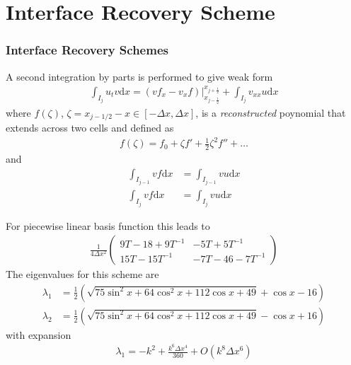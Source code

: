 \documentclass[serif,12pt]{beamer}
\begin{document}
\section{Interface Recovery Scheme}
\begin{frame}
  \frametitle{Interface Recovery Schemes}
  A second integration by parts is performed to give weak form
  \begin{align*}
    \int_{I_j} u_t v \mathrm{d}x 
    =
    \left(vf_x - v_xf\right) \bigr|_{x_{j-\frac{1}{2}}}^{x_{j+\frac{1}{2}}}
    +
    \int_{I_j}v_{xx}u\mathrm{d}x
  \end{align*}
  where $f(\zeta)$, $\zeta=x_{j-1/2}-x \in [-\Delta x,\Delta x]$, is a
  \emph{reconstructed} poynomial that extends across two cells
  and defined as
  \begin{align*}
    f(\zeta) = f_0 + \zeta f' + \frac{1}{2}\zeta^2 f'' + \ldots
  \end{align*}
  and
  \begin{align*}
    \int_{I_{j-1}} v f \mathrm{d}x &= \int_{I_{j-1}} v u \mathrm{d}x \\
    \int_{I_{j}} v f \mathrm{d}x &= \int_{I_{j}} v u \mathrm{d}x
  \end{align*}
\end{frame}

\begin{frame}
  For piecewise linear basis function this leads to
  \begin{align*}
    \frac{1}{4\Delta x^2}
    \left(
    \begin{array}{cc}
      9T-18+9T^{-1} & -5T + 5T^{-1} \\
      15 T -15 T^{-1} & -7 T - 46 - 7T^{-1}
    \end{array}
    \right)
  \end{align*}
  The eigenvalues for this scheme are
  \begin{align*}
    \lambda_1 &= \frac{1}{2}\left(\sqrt{75\sin^2 x+64\cos^2 x+112\cos x+49}+\cos x-16\right) \\
    \lambda_2 &= \frac{1}{2}\left(\sqrt{75\sin^2 x+64\cos^2 x+112\cos x+49}-\cos x+16\right)
  \end{align*}
  with expansion
  \begin{align*}
    \lambda_1 = -k^2 + \frac{k^6 \Delta x^4}{360} + O(k^8\Delta x^6)
  \end{align*}  
\end{frame}
\end{document}
